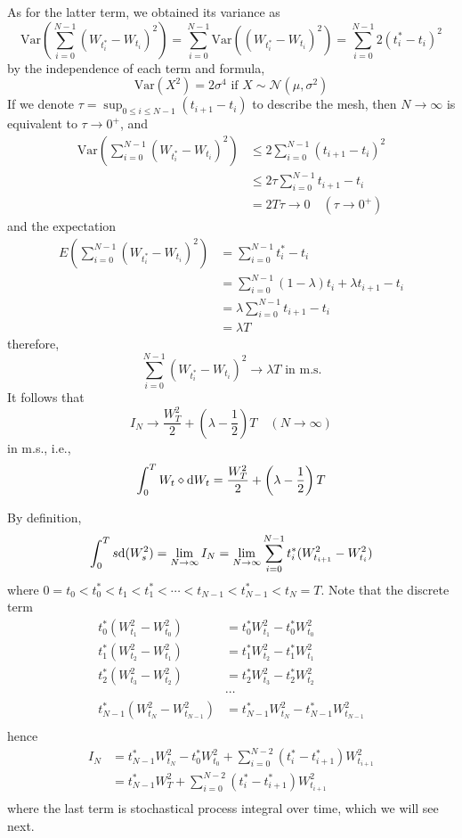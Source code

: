 \documentclass{homework}
\newcommand{\var}{\mathrm{Var}}
\begin{document}
    As for the latter term, we obtained its variance as
    \[\var\left(\sum_{i=0}^{N-1}(W_{t_i^*}-W_{t_i})^2\right)
    =\sum_{i=0}^{N-1}\var\left((W_{t_i^*}-W_{t_i})^2\right)
    =\sum_{i=0}^{N-1}2(t_i^*-t_i)^2\]
    by the independence of each term and formula,
    \[\var(X^2)=2\sigma^4\text{ if }X\sim\mathcal N(\mu,\sigma^2)\]
    If we denote $\tau=\sup_{0\leq i\leq N-1}(t_{i+1}-t_i)$ to describe
    the mesh, then $N\to\infty$ is equivalent to $\tau\to 0^+$, and
    \[\begin{aligned}
        \var\left(\sum_{i=0}^{N-1}(W_{t_i^*}-W_{t_i})^2\right)
    &\leq 2\sum_{i=0}^{N-1}(t_{i+1}-t_i)^2\\
    &\leq 2\tau\sum_{i=0}^{N-1}t_{i+1}-t_i\\
    &=2T\tau\to 0\quad(\tau\to 0^+)
    \end{aligned}\]
    and the expectation
    \[\begin{aligned}
        E\left(\sum_{i=0}^{N-1}(W_{t_i^*}-W_{t_i})^2\right)
        &=\sum_{i=0}^{N-1}t_i^*-t_i\\
        &=\sum_{i=0}^{N-1}(1-\lambda)t_i+\lambda t_{i+1}-t_i\\
        &=\lambda\sum_{i=0}^{N-1}t_{i+1}-t_{i}\\
        &=\lambda T
    \end{aligned}\]
    therefore,
    \[\sum_{i=0}^{N-1}(W_{t_i^*}-W_{t_i})^2\to\lambda T
    \text{ in m.s.}\]
    It follows that
    \[I_N\to \frac{W_T^2}{2}+\left(\lambda-\frac{1}{2}\right)T
    \quad(N\to\infty)\]
    in m.s., i.e.,
    \[\int_0^TW_t\diamond\mathrm d W_t=
    \frac{W_T^2}{2}+\left(\lambda-\frac{1}{2}\right)T\]

    \problem
    By definition,
    \[\int_0^Ts\mathrm d(W_s^2)
    =\lim_{N\to\infty}I_N
    =\lim_{N\to\infty}\sum_{i=0}^{N-1}t_i^*(W_{t_{i+1}}^2-W_{t_i}^2)\]
    where
    $0=t_0<t_0^*<t_1<t_1^*<\cdots<t_{N-1}<t_{N-1}^*<t_N=T$.
    Note that the discrete term
    \[\begin{aligned}
        t_0^*(W_{t_1}^2-W_{t_0}^2)&=t_0^*W_{t_1}^2-t_0^*W_{t_0}^2\\
        t_1^*(W_{t_2}^2-W_{t_1}^2)&=t_1^*W_{t_2}^2-t_1^*W_{t_1}^2\\
        t_2^*(W_{t_3}^2-W_{t_2}^2)&=t_2^*W_{t_3}^2-t_2^*W_{t_2}^2\\
        &\cdots\\
        t_{N-1}^*(W_{t_N}^2-W_{t_{N-1}}^2)&=t_{N-1}^*W_{t_N}^2-t_{N-1}^*W_{t_{N-1}}^2\\
    \end{aligned}\]
    hence
    \[\begin{aligned}
        I_N
        &=t_{N-1}^*W_{t_N}^2-t_0^*W_{t_0}^2
          +\sum_{i=0}^{N-2}(t_i^*-t_{i+1}^*)W_{t_{i+1}}^2\\
        &=t^*_{N-1}W_T^2
          +\sum_{i=0}^{N-2}(t_i^*-t_{i+1}^*)W_{t_{i+1}}^2\\
    \end{aligned}\]
    where the last term is stochastical process integral
    over time, which we will see next.
\end{document}
